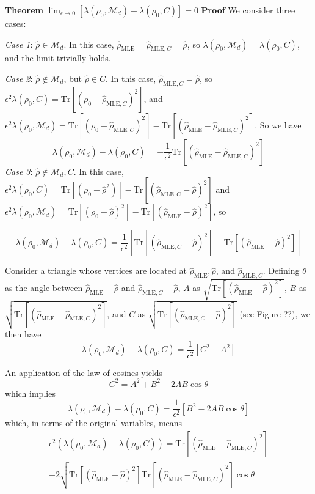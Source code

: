 \documentclass[aps,pra, twocolumn]{revtex4-1}
\newcommand{\M}{\mathcal{M}}
\newcommand{\rhohat}{\hat{\rho}}
\newcommand{\rhoMLE}{\rhohat_{\scriptscriptstyle\mathrm{MLE}}}
\begin{document}
\textbf{Theorem} $\lim_{\epsilon \rightarrow 0} [\lambda(\rho_{0}, \M_{d}) - \lambda(\rho_{0}, C)] = 0$
\textbf{Proof} We consider three cases:

\emph{Case 1}: $\rhohat \in \M_{d}$. In this case, $\rhoMLE = \hat{\rho}_{\mathrm{MLE}, C} = \rhohat$, so $\lambda(\rho_{0}, \M_{d}) = \lambda(\rho_{0}, C)$, and the limit trivially holds.

\emph{Case 2}: $\rhohat \not \in \M_{d}$, but $\rhohat \in C$. In this case, $\hat{\rho}_{\mathrm{MLE}, C} = \rhohat$, so $\epsilon^{2}\lambda(\rho_{0}, C) = \mathrm{Tr}[(\rho_{0}-\hat{\rho}_{\mathrm{MLE}, C})^{2}]$, and $\epsilon^{2}\lambda(\rho_{0}, \M_{d}) = \mathrm{Tr}[(\rho_{0} - \hat{\rho}_{\mathrm{MLE}, C})^{2}] - \mathrm{Tr}[(\rhoMLE - \hat{\rho}_{\mathrm{MLE}, C})^{2}]$. So we have
\[\lambda(\rho_{0}, \M_{d}) - \lambda(\rho_{0}, C) = -\frac{1}{\epsilon^{2}}\mathrm{Tr}[(\rhoMLE - \hat{\rho}_{\mathrm{MLE}, C})^{2}]\] 
\emph{Case 3}: $\rhohat \not \in \M_{d}, C$. In this case, $\epsilon^{2}\lambda(\rho_{0}, C) = \mathrm{Tr}[(\rho_{0} - \rhohat^{2})] - \mathrm{Tr}[(\hat{\rho}_{\mathrm{MLE}, C} - \rhohat)^{2}]$ and $\epsilon^{2}\lambda(\rho_{0},\M_{d}) = \mathrm{Tr}[(\rho_{0} - \hat{\rho})^{2}]- \mathrm{Tr}[(\rhoMLE - \hat{\rho})^{2}]$, so

\[\lambda(\rho_{0}, \M_{d}) - \lambda(\rho_{0}, C) = \frac{1}{\epsilon^{2}}\left[\mathrm{Tr}[(\hat{\rho}_{\mathrm{MLE}, C} - \rhohat)^{2}] -  \mathrm{Tr}[(\rhoMLE - \hat{\rho})^{2}]\right]\]

Consider a triangle whose vertices are located at $\rhoMLE, \rhohat$, and $\hat{\rho}_{\mathrm{MLE}, C}$. Defining $\theta$ as the angle between $\rhoMLE - \rhohat$ and $\hat{\rho}_{\mathrm{MLE}, C} - \rhohat$, $A$ as $\sqrt{\mathrm{Tr}[(\rhoMLE - \hat{\rho})^{2}]}$, $B$ as $\sqrt{\mathrm{Tr}[(\rhoMLE - \hat{\rho}_{\mathrm{MLE}, C})^{2}]}$, and $C$ as $\sqrt{\mathrm{Tr}[(\hat{\rho}_{\mathrm{MLE}, C} - \rhohat)^{2}]}$ (see Figure ??), we then have
\[\lambda(\rho_{0}, \M_{d}) - \lambda(\rho_{0}, C) = \frac{1}{\epsilon^{2}}\left[C^{2} - A^{2}\right]\]

An application of the law of cosines yields
\[C^{2} = A^{2} + B^{2} - 2AB\cos\theta\]
which implies
\[\lambda(\rho_{0}, \M_{d}) - \lambda(\rho_{0}, C) = \frac{1}{\epsilon^{2}}\left[B^{2} - 2AB\cos\theta\right]\]
which, in terms of the original variables, means
\begin{align}
\nonumber \epsilon^{2}(\lambda(\rho_{0}, \M_{d}) - \lambda(\rho_{0}, C)) = \mathrm{Tr}[(\rhoMLE - \hat{\rho}_{\mathrm{MLE}, C})^{2}]\\
-2\sqrt{\mathrm{Tr}[(\rhoMLE - \hat{\rho})^{2}]\mathrm{Tr}[(\rhoMLE - \hat{\rho}_{\mathrm{MLE}, C})^{2}]}\cos\theta
\end{align}
\end{document}
